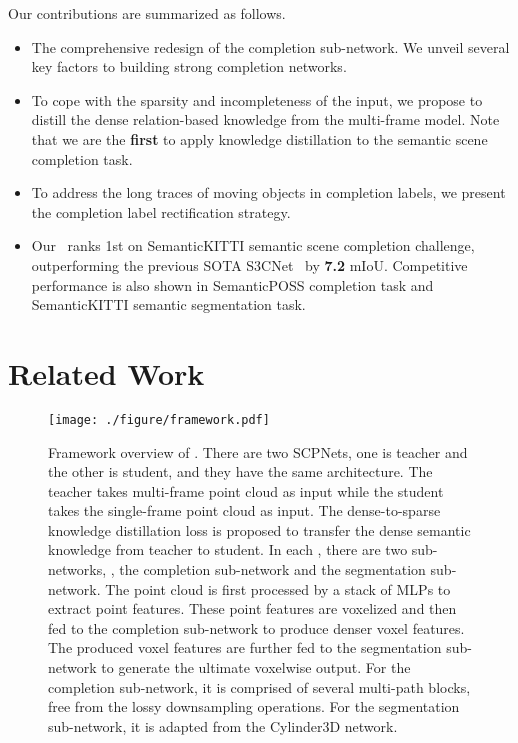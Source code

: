 \documentclass[10pt,twocolumn,letterpaper]{article}
\begin{document}
Our contributions are summarized as follows.
\begin{itemize}

\item {The comprehensive redesign of the completion sub-network. We unveil several key factors to building strong completion networks.}
\item {To cope with the sparsity and incompleteness of the input, we propose to distill the dense relation-based knowledge from the multi-frame model. Note that we are the \textbf{first} to apply knowledge distillation to the semantic scene completion task.}
\item {To address the long traces of moving objects in completion labels, we present the completion label rectification strategy.}
\item {Our \algorithmname~ranks 1st on SemanticKITTI semantic scene completion challenge, outperforming the previous SOTA S3CNet~\cite{s3cnet} by \textbf{7.2} mIoU. Competitive performance is also shown in SemanticPOSS completion task and SemanticKITTI semantic segmentation task.}
\end{itemize}
 
\section{Related Work}
\label{sec:relatedwork}




\begin{figure*}[!ht]
 \centering
 \texttt{[image: ./figure/framework.pdf]}
 \vskip -0.3cm
 \caption{Framework overview of \algorithmname. There are two SCPNets, one is teacher and the other is student, and they have the same architecture. The teacher takes multi-frame point cloud as input while the student takes the single-frame point cloud as input. The dense-to-sparse knowledge distillation loss is proposed to transfer the dense semantic knowledge from teacher to student. In each \algorithmname, there are two sub-networks, \ie, the completion sub-network and the segmentation sub-network. The point cloud is first processed by a stack of MLPs to extract point features. These point features are voxelized and then fed to the completion sub-network to produce denser voxel features. The produced voxel features are further fed to the segmentation sub-network to generate the ultimate voxelwise output. For the completion sub-network, it is comprised of several multi-path blocks, free from the lossy downsampling operations. For the segmentation sub-network, it is adapted from the Cylinder3D network.}
 \centering
 \vskip -0.4cm
 \label{fig:framework}
\end{figure*}
\end{document}
